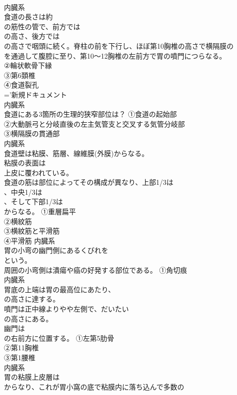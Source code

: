 \documentclass[8pt]{extreport}
\begin{document}
\begin{CJK}{UTF8}{min}
\\	内臓系
\\	食道の長さは約
\\	の筋性の管で、前方では
\\	の高さ、後方では
\\	の高さで咽頭に続く。脊柱の前を下行し、ほぼ第10胸椎の高さで横隔膜の
\\	を通過して腹腔に至り、第10～12胸椎の左前方で胃の噴門につらなる。	
\\	②輪状軟骨下縁
\\	③第6頚椎
\\	④食道裂孔
\\	='新規ドキュメント 
\\	内臓系
\\	食道にある3箇所の生理的狭窄部位は？	①食道の起始部
\\	②大動脈弓と分岐直後の左主気管支と交叉する気管分岐部
\\	③横隔膜の貫通部
\\	内臓系
\\	食道壁は粘膜、筋層、線維膜(外膜)からなる。
\\	粘膜の表面は
\\	上皮に覆われている。
\\	食道の筋は部位によってその構成が異なり、上部1/3は
\\	、中央1/3は
\\	、そして下部1/3は
\\	からなる。	①重層扁平
\\	②横紋筋
\\	③横紋筋と平滑筋
\\	④平滑筋	内臓系
\\	胃の小弯の幽門側にあるくびれを
\\	という。
\\	周囲の小弯側は潰瘍や癌の好発する部位である。	①角切痕
\\	内臓系
\\	胃底の上端は胃の最高位にあたり、
\\	の高さに達する。
\\	噴門は正中線よりやや左側で、だいたい
\\	の高さにある。
\\	幽門は
\\	の右前方に位置する。	①左第5肋骨
\\	②第11胸椎
\\	③第1腰椎
\\	内臓系
\\	胃の粘膜上皮層は
\\	からなり、これが胃小窩の底で粘膜内に落ち込んで多数の

\end{CJK}
\end{document}
